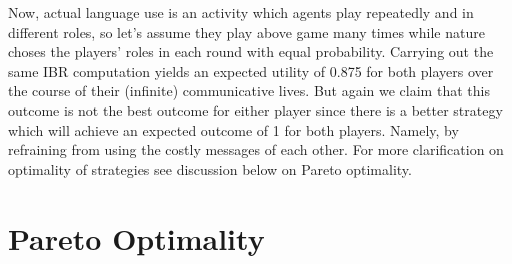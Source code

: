 \documentclass{article}
\begin{document}
Now, actual language use is an activity which agents play repeatedly and in different roles, so let's assume they play above game many times while nature choses the players' roles in each round with equal probability. Carrying out the same IBR computation yields an expected utility of 0.875 for both players over the course of their (infinite) communicative lives. But again we claim that this outcome is not the best outcome for either player since there is a better strategy which will achieve an expected outcome of 1 for both players. Namely, by refraining from using the costly messages of each other. For more clarification on optimality of strategies see discussion below on Pareto optimality.

\begin{comment}
Starting from Spence's seminal "Job Market Signalling", much has been written about games where by sending a message an agent causes a cost. This is the core of so-called \textit{costly signalling games}. Particularly economic theory has been interested in this twist of the Lewisian signaling model.\\
Common assumptions here are that the message's meaning is determined before the start of the game and that sender's cost vector is common knowledge, which, in turn, allows the receiver to distinguish credible and non-credible signals.\\


\begin{table}[h]
\centering
\begin{tabular}{lllll}
States & Cost Sender & Messages & {Cost Receiver} & {Actions} \\ 
$t_1$  & c           & $m_1$    & 0                                  & $a_1$                        \\
$t_2$  & c           & $m_2$    & 0                                  & $a_2$                       
\end{tabular}
\end{table} 
\end{comment}

\section{Pareto Optimality}
\end{document}
